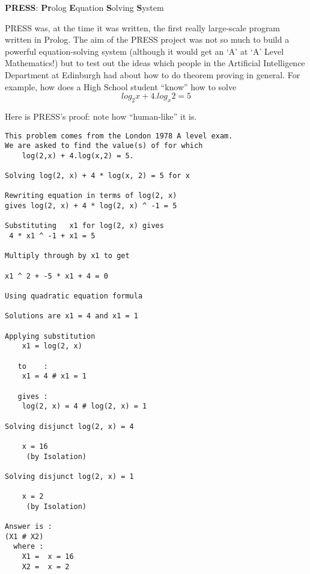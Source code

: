 \pagestyle{empty}

\vspace*{2.15in}
\begin{center}
\begin{large}
{\bf PRESS}: {\bf Pr}olog {\bf E}quation {\bf S}olving {\bf S}ystem
\end{large}
\end{center}
PRESS was, at the time it was written, the first really large-scale
program written in Prolog. The aim of the PRESS project was not so much
to build a powerful equation-solving system (although it would get
an `A' at `A' Level Mathematics!) but to test out the ideas which
people in the Artificial Intelligence Department at Edinburgh had
about how to do theorem proving in general.
For example, how does a High School student ``know'' how to solve
\[ 	log_2 x + 4.log_x 2 = 5 \]

Here is PRESS's proof: note how ``human-like'' it is.

\begin{footnotesize}

\begin{verbatim}
This problem comes from the London 1978 A level exam.
We are asked to find the value(s) of for which
	log(2,x) + 4.log(x,2) = 5.

Solving log(2, x) + 4 * log(x, 2) = 5 for x

Rewriting equation in terms of log(2, x)
gives log(2, x) + 4 * log(2, x) ^ -1 = 5

Substituting   x1 for log(2, x) gives
 4 * x1 ^ -1 + x1 = 5

Multiply through by x1 to get 

x1 ^ 2 + -5 * x1 + 4 = 0

Using quadratic equation formula

Solutions are x1 = 4 and x1 = 1

Applying substitution 
    x1 = log(2, x)

   to    : 
    x1 = 4 # x1 = 1

   gives : 
    log(2, x) = 4 # log(2, x) = 1

Solving disjunct log(2, x) = 4

    x = 16
     (by Isolation)

Solving disjunct log(2, x) = 1

    x = 2
     (by Isolation)

Answer is : 
(X1 # X2)
  where :
    X1 =  x = 16
    X2 =  x = 2

\end{verbatim}

\end{footnotesize}





